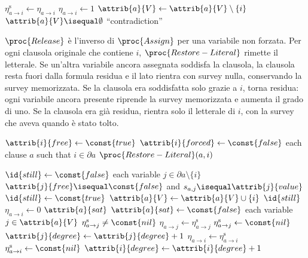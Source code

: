 \begin{codebox}
\li $\eta^{\mathrm{s}}_{a \to i} \gets \eta_{a \to i}$
\li $\eta_{a \to i} \gets 1$
\li $\attrib{a}{V} \gets \attrib{a}{V} \setminus \{i\}$
\li \If $\attrib{a}{V} \isequal \emptyset$
\li     \Then \Error ``contradiction''
        \End
\end{codebox}

$\proc{Release}$ è l'inverso di $\proc{Assign}$ per una variabile non forzata.
Per ogni clausola originale che contiene $i$, $\proc{Restore-Literal}$ rimette il letterale.
Se un'altra variabile ancora assegnata soddisfa la clausola, la clausola resta fuori dalla formula residua e il lato rientra con survey nulla, conservando la survey memorizzata.
Se la clausola era soddisfatta solo grazie a $i$, torna residua: ogni variabile ancora presente riprende la survey memorizzata e aumenta il grado di uno.
Se la clausola era già residua, rientra solo il letterale di $i$, con la survey che aveva quando è stato tolto.

\begin{codebox}
\li $\attrib{i}{free} \gets \const{true}$
\li $\attrib{i}{forced} \gets \const{false}$
\li \For each clause $a$ such that $i \in \partial a$
\li     \Do $\proc{Restore-Literal}(a, i)$
        \End
\end{codebox}

\begin{codebox}
\li $\id{still} \gets \const{false}$
\li \For each variable $j \in \partial a \setminus \{i\}$
\li     \Do
            \If $\attrib{j}{free} \isequal \const{false}$ and $s_{a,j} \isequal \attrib{j}{value}$
\li             \Then $\id{still} \gets \const{true}$
                \End
        \End
\li $\attrib{a}{V} \gets \attrib{a}{V} \cup \{i\}$
\li \If $\id{still}$
\li     \Then $\eta_{a \to i} \gets 0$
\li     \Else
            \If $\attrib{a}{sat}$
\li             \Then
                    $\attrib{a}{sat} \gets \const{false}$
\li                 \For each variable $j \in \attrib{a}{V}$
\li                     \Do
                            \If $\eta^{\mathrm{s}}_{a \to j} \neq \const{nil}$
\li                             \Then
                                    $\eta_{a \to j} \gets \eta^{\mathrm{s}}_{a \to j}$
\li                                 $\eta^{\mathrm{s}}_{a \to j} \gets \const{nil}$
                                \End
\li                         $\attrib{j}{degree} \gets \attrib{j}{degree} + 1$
                        \End
\li             \Else
                    $\eta_{a \to i} \gets \eta^{\mathrm{s}}_{a \to i}$
\li                 $\eta^{\mathrm{s}}_{a \to i} \gets \const{nil}$
\li                 $\attrib{i}{degree} \gets \attrib{i}{degree} + 1$
                \End
        \End
\end{codebox}

